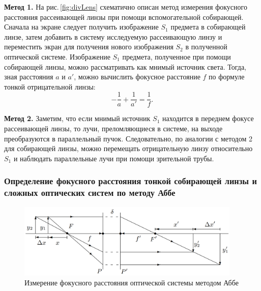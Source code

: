 \documentclass[a4paper,12pt]{article} %
\begin{document}
\textbf{Метод 1.} На рис.\,\ref{fig:divLens} схематично описан метод измерения фокусного расстояния рассеивающей линзы при помощи вспомогательной собирающей. Сначала на экране следует получить изображение $S_1$ предмета в собирающей линзе, затем добавить в систему исследуемую рассеивающую линзу и переместить экран для получения нового изображения $S_2$ в полученной оптической системе. Изображение $S_1$ предмета, полученное при помощи собирающей линзы, можно рассматривать как мнимый источник света. Тогда, зная расстояния $a$ и $a'$, можно вычислить фокусное расстояние $f$ по формуле тонкой отрицательной линзы:
\begin{equation} \label{divergingLens}
  -\frac{1}{a} + \frac{1}{a'} = \frac{1}{f}.
\end{equation}

\textbf{Метод 2.} Заметим, что если мнимый источник $S_1$ находится в переднем фокусе рассеивающей линзы, то лучи, преломляющиеся в системе, на выходе преобразуются в параллельный пучок. Следовательно, по аналогии с методом 2 для собирающей линзы, можно перемещать отрицательную линзу относительно $S_1$ и наблюдать параллельные лучи при помощи зрительной трубы. 

\subsubsection*{Определение фокусного расстояния тонкой собирающей линзы и сложных оптических систем по методу Аббе}

\begin{figure}[h]
    \centering
    \includegraphics[width=0.95\textwidth]{AbbeMethod.png}
    \caption{Измерение фокусного расстояния оптической системы методом Аббе}
    \label{fig:AbbeMethod}
\end{figure}
\end{document}
